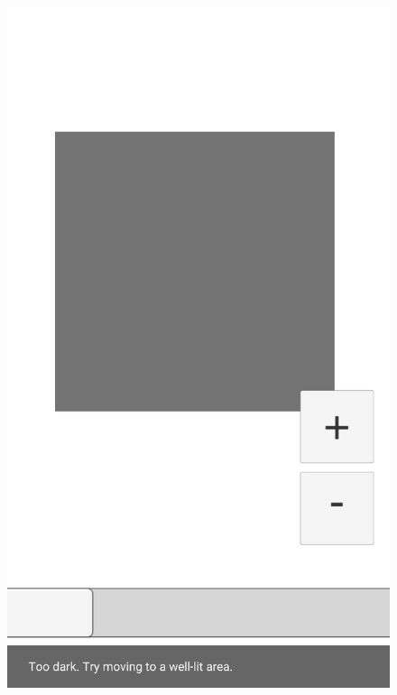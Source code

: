 \begin{figure}[htbp]
\centering
    \hspace{-4mm}
    \begin{minipage}{0.3\textwidth}
        \centering
        \includegraphics[scale=0.15]{Images/Shaders/profundidad (1).png}\\
    \end{minipage}
    \begin{minipage}{0.3\textwidth}
        \centering

\end{minipage}
\end{figure}
